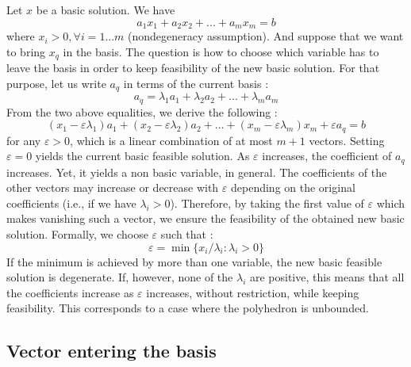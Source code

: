 Let $x$ be a basic solution. We have \[ a_1x_1 + a_2x_2 + ... + a_mx_m = b \] where $x_i>0, \forall i = 1...m$ (nondegeneracy assumption). And suppose that we want to bring $x_q$ in the basis. The question is how to choose which variable has to leave the basis in order to keep feasibility of the new basic solution. For that purpose, let us write $a_q$ in terms of the current basis : \[ a_q = \lambda_1 a_1 + \lambda_2 a_2 + ... + \lambda_m a_m \] From the two above equalities, we derive the following : {\small \[ (x_1 - \varepsilon \lambda_1)a_1 + (x_2 - \varepsilon\lambda_2)a_2 + ... + (x_m - \varepsilon\lambda_m)x_m + \varepsilon a_q = b \]} for any $\varepsilon > 0$, which is a linear combination of at most $m+1$ vectors. Setting $\varepsilon = 0$ yields the current basic feasible solution. As $\varepsilon$ increases, the coefficient of $a_q$ increases. Yet, it yields a non basic variable, in general. The coefficients of the other vectors may increase or decrease with $\varepsilon$ depending on the original coefficients (i.e., if we have $\lambda_i > 0$). Therefore, by taking the first value of $\varepsilon$ which makes vanishing such a vector, we ensure the feasibility of the obtained new basic solution. Formally, we choose $\varepsilon$ such that : 
\[ \varepsilon = \min\{ x_i/\lambda_i : \lambda_i > 0 \} \] If the minimum is achieved by more than one variable, the new basic feasible solution is degenerate. If, however, none of the $\lambda_i$ are positive, this means that all the coefficients increase as $\varepsilon$ increases, without restriction, while keeping feasibility. This corresponds to a case where the polyhedron is unbounded. 

\subsection{Vector entering the basis}

